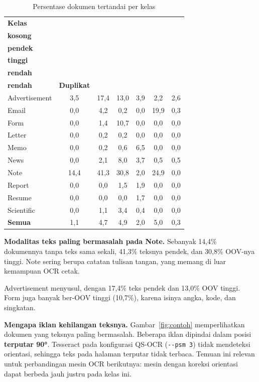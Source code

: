 \begin{table}[H]
  \centering
  \caption{Persentase dokumen tertandai per kelas}
  \label{tab:penanda-kelas}
  \fontsize{10}{12}\selectfont
  \begin{tabular}{|l|c|c|c|c|c|c|}
    \hline
    \textbf{Kelas} & \makecell{\textbf{Teks}\\\textbf{kosong}} &
    \makecell{\textbf{Teks}\\\textbf{pendek}} & \makecell{\textbf{OOV}\\\textbf{tinggi}} &
    \makecell{\textbf{Resolusi}\\\textbf{rendah}} &
    \makecell{\textbf{Ketajaman}\\\textbf{rendah}} & \textbf{Duplikat} \\ \hline
    Advertisement & 3,5 & 17,4 & 13,0 & 3,9 & 2,2 & 2,6 \\ \hline
    Email & 0,0 & 4,2 & 0,2 & 0,0 & 19,9 & 0,3 \\ \hline
    Form & 0,0 & 1,4 & 10,7 & 0,0 & 0,0 & 0,0 \\ \hline
    Letter & 0,0 & 0,2 & 0,2 & 0,0 & 0,0 & 0,0 \\ \hline
    Memo & 0,0 & 0,2 & 0,6 & 6,5 & 0,0 & 0,0 \\ \hline
    News & 0,0 & 2,1 & 8,0 & 3,7 & 0,5 & 0,5 \\ \hline
    Note & 14,4 & 41,3 & 30,8 & 2,0 & 24,9 & 0,0 \\ \hline
    Report & 0,0 & 0,0 & 1,5 & 1,9 & 0,0 & 0,0 \\ \hline
    Resume & 0,0 & 0,0 & 0,0 & 1,7 & 0,0 & 0,0 \\ \hline
    Scientific & 0,0 & 1,1 & 3,4 & 0,4 & 0,0 & 0,0 \\ \hline
    \textbf{Semua} & 1,1 & 4,7 & 4,9 & 2,0 & 5,0 & 0,3 \\ \hline
  \end{tabular}
\end{table}

\textbf{Modalitas teks paling bermasalah pada Note.} Sebanyak 14,4\% dokumennya tanpa
teks sama sekali, 41,3\% teksnya pendek, dan 30,8\% OOV-nya tinggi. Note sering berupa
catatan tulisan tangan, yang memang di luar kemampuan OCR cetak.

Advertisement menyusul, dengan 17,4\% teks pendek dan 13,0\% OOV tinggi. Form juga
banyak ber-OOV tinggi (10,7\%), karena isinya angka, kode, dan singkatan.

\textbf{Mengapa iklan kehilangan teksnya.} Gambar~\ref{fig:contoh} memperlihatkan
dokumen yang teksnya paling bermasalah. Beberapa iklan dipindai dalam posisi
\textbf{terputar 90°}. Tesseract pada konfigurasi QS-OCR (\texttt{-{}-psm 3}) tidak
mendeteksi orientasi, sehingga teks pada halaman terputar tidak terbaca. Temuan ini
relevan untuk perbandingan mesin OCR berikutnya: mesin dengan koreksi orientasi dapat
berbeda jauh justru pada kelas ini.

